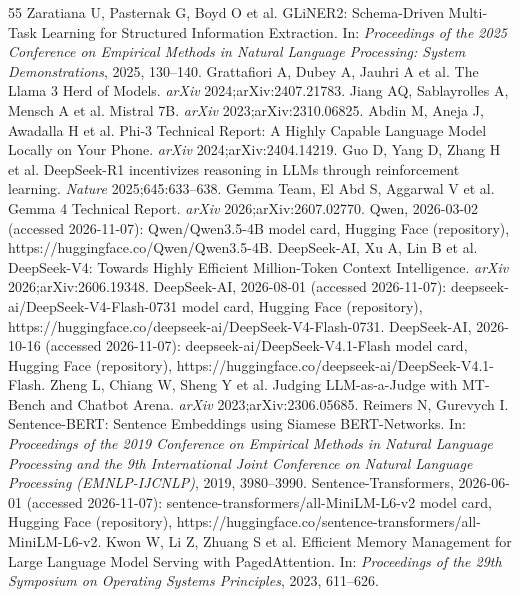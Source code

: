 \documentclass[11pt,a4paper]{article}
\begin{document}
\begin{thebibliography}{55}
Zaratiana U, Pasternak G, Boyd O et al. GLiNER2: Schema-Driven Multi-Task Learning for Structured Information Extraction. In: \emph{Proceedings of the 2025 Conference on Empirical Methods in Natural Language Processing: System Demonstrations}, 2025, 130–140.
Grattafiori A, Dubey A, Jauhri A et al. The Llama 3 Herd of Models. \emph{arXiv} 2024;arXiv:2407.21783.
Jiang AQ, Sablayrolles A, Mensch A et al. Mistral 7B. \emph{arXiv} 2023;arXiv:2310.06825.
Abdin M, Aneja J, Awadalla H et al. Phi-3 Technical Report: A Highly Capable Language Model Locally on Your Phone. \emph{arXiv} 2024;arXiv:2404.14219.
Guo D, Yang D, Zhang H et al. DeepSeek-R1 incentivizes reasoning in LLMs through reinforcement learning. \emph{Nature} 2025;645:633–638.
Gemma Team, El Abd S, Aggarwal V et al. Gemma 4 Technical Report. \emph{arXiv} 2026;arXiv:2607.02770.
Qwen, 2026-03-02 (accessed 2026-11-07): Qwen/Qwen3.5-4B model card, Hugging Face (repository), https://huggingface.co/Qwen/Qwen3.5-4B.
DeepSeek-AI, Xu A, Lin B et al. DeepSeek-V4: Towards Highly Efficient Million-Token Context Intelligence. \emph{arXiv} 2026;arXiv:2606.19348.
DeepSeek-AI, 2026-08-01 (accessed 2026-11-07): deepseek-ai/DeepSeek-V4-Flash-0731 model card, Hugging Face (repository), https://huggingface.co/deepseek-ai/DeepSeek-V4-Flash-0731.
DeepSeek-AI, 2026-10-16 (accessed 2026-11-07): deepseek-ai/DeepSeek-V4.1-Flash model card, Hugging Face (repository), https://huggingface.co/deepseek-ai/DeepSeek-V4.1-Flash.
Zheng L, Chiang W, Sheng Y et al. Judging LLM-as-a-Judge with MT-Bench and Chatbot Arena. \emph{arXiv} 2023;arXiv:2306.05685.
Reimers N, Gurevych I. Sentence-BERT: Sentence Embeddings using Siamese BERT-Networks. In: \emph{Proceedings of the 2019 Conference on Empirical Methods in Natural Language Processing and the 9th International Joint Conference on Natural Language Processing (EMNLP-IJCNLP)}, 2019, 3980–3990.
Sentence-Transformers, 2026-06-01 (accessed 2026-11-07): sentence-transformers/all-MiniLM-L6-v2 model card, Hugging Face (repository), https://huggingface.co/sentence-transformers/all-MiniLM-L6-v2.
Kwon W, Li Z, Zhuang S et al. Efficient Memory Management for Large Language Model Serving with PagedAttention. In: \emph{Proceedings of the 29th Symposium on Operating Systems Principles}, 2023, 611–626.

\end{thebibliography}
\end{document}
